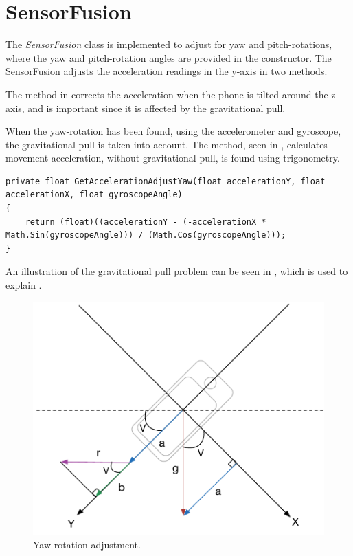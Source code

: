 \section{SensorFusion}\label{section:SensorFusion}
The \textit{SensorFusion} class is implemented to adjust for yaw and pitch-rotations, where the yaw and pitch-rotation angles are provided in the constructor.
The SensorFusion adjusts the acceleration readings in the y-axis in two methods.


The method in  corrects the acceleration when the phone is tilted around the z-axis, and is important since it is affected by the gravitational pull.

When the yaw-rotation has been found, using the accelerometer and gyroscope, the gravitational pull is taken into account. 
The method, seen in , calculates movement acceleration, without gravitational pull, is found using trigonometry.

\begin{lstlisting}[caption={Method correcting acceleration when tilted around the z-axis.}, label=lst:acceleration-yaw, float=h, style=sharpc]
private float GetAccelerationAdjustYaw(float accelerationY, float accelerationX, float gyroscopeAngle)
{
	return (float)((accelerationY - (-accelerationX * Math.Sin(gyroscopeAngle))) / (Math.Cos(gyroscopeAngle)));
}
\end{lstlisting}

An illustration of the gravitational pull problem can be seen in , which is used to explain .

\begin{figure}[H]
	\centering
	\includegraphics[trim = 0cm 0cm 0cm 3cm, clip, scale=0.75]{media/graph}
	\caption{Yaw-rotation adjustment.}
	\label{figure:yaw-rotation-adjustment}
\end{figure}

